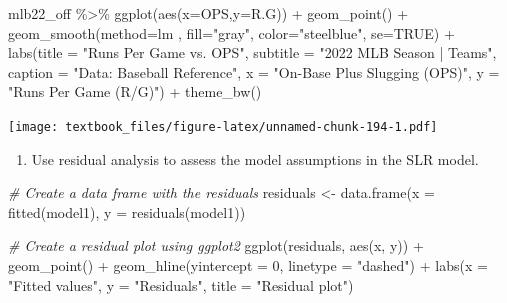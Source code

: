 \documentclass[
  11pt,
]{book}
\newenvironment{Shaded}{\begin{snugshade}}{\end{snugshade}}
\newcommand{\AttributeTok}[1]{\textcolor[rgb]{0.77,0.63,0.00}{#1}}
\newcommand{\CommentTok}[1]{\textcolor[rgb]{0.56,0.35,0.01}{\textit{#1}}}
\newcommand{\ConstantTok}[1]{\textcolor[rgb]{0.00,0.00,0.00}{#1}}
\newcommand{\DecValTok}[1]{\textcolor[rgb]{0.00,0.00,0.81}{#1}}
\newcommand{\FunctionTok}[1]{\textcolor[rgb]{0.00,0.00,0.00}{#1}}
\newcommand{\NormalTok}[1]{#1}
\newcommand{\OtherTok}[1]{\textcolor[rgb]{0.56,0.35,0.01}{#1}}
\newcommand{\SpecialCharTok}[1]{\textcolor[rgb]{0.00,0.00,0.00}{#1}}
\newcommand{\StringTok}[1]{\textcolor[rgb]{0.31,0.60,0.02}{#1}}
\providecommand{\tightlist}{%
  \setlength{\itemsep}{0pt}\setlength{\parskip}{0pt}}
\theoremstyle{definition}
\theoremstyle{definition}
\theoremstyle{definition}
\theoremstyle{definition}
\theoremstyle{remark}
\begin{document}
\begin{Shaded}
\begin{Highlighting}[]
\NormalTok{mlb22\_off }\SpecialCharTok{\%\textgreater{}\%} \FunctionTok{ggplot}\NormalTok{(}\FunctionTok{aes}\NormalTok{(}\AttributeTok{x=}\NormalTok{OPS,}\AttributeTok{y=}\NormalTok{R.G)) }\SpecialCharTok{+} \FunctionTok{geom\_point}\NormalTok{() }\SpecialCharTok{+}
  \FunctionTok{geom\_smooth}\NormalTok{(}\AttributeTok{method=}\NormalTok{lm , }\AttributeTok{fill=}\StringTok{"gray"}\NormalTok{, }\AttributeTok{color=}\StringTok{"steelblue"}\NormalTok{, }\AttributeTok{se=}\ConstantTok{TRUE}\NormalTok{) }\SpecialCharTok{+}
  \FunctionTok{labs}\NormalTok{(}\AttributeTok{title =} \StringTok{"Runs Per Game vs. OPS"}\NormalTok{,}
       \AttributeTok{subtitle =} \StringTok{"2022 MLB Season | Teams"}\NormalTok{,}
       \AttributeTok{caption =} \StringTok{"Data: Baseball Reference"}\NormalTok{, }
       \AttributeTok{x =} \StringTok{"On{-}Base Plus Slugging (OPS)"}\NormalTok{,}
       \AttributeTok{y =} \StringTok{"Runs Per Game (R/G)"}\NormalTok{) }\SpecialCharTok{+}
  \FunctionTok{theme\_bw}\NormalTok{()}
\end{Highlighting}
\end{Shaded}

\texttt{[image: textbook\_files/figure-latex/unnamed-chunk-194-1.pdf]}

\newpage

\begin{enumerate}
\def\labelenumi{(\alph{enumi})}
\setcounter{enumi}{4}
\tightlist
\item
  Use residual analysis to assess the model assumptions in the SLR model.
\end{enumerate}

\begin{Shaded}
\begin{Highlighting}[]
\CommentTok{\# Create a data frame with the residuals}
\NormalTok{residuals }\OtherTok{\textless{}{-}} \FunctionTok{data.frame}\NormalTok{(}\AttributeTok{x =} \FunctionTok{fitted}\NormalTok{(model1), }\AttributeTok{y =} \FunctionTok{residuals}\NormalTok{(model1))}

\CommentTok{\# Create a residual plot using ggplot2}
\FunctionTok{ggplot}\NormalTok{(residuals, }\FunctionTok{aes}\NormalTok{(x, y)) }\SpecialCharTok{+}
  \FunctionTok{geom\_point}\NormalTok{() }\SpecialCharTok{+}
  \FunctionTok{geom\_hline}\NormalTok{(}\AttributeTok{yintercept =} \DecValTok{0}\NormalTok{, }\AttributeTok{linetype =} \StringTok{"dashed"}\NormalTok{) }\SpecialCharTok{+}
  \FunctionTok{labs}\NormalTok{(}\AttributeTok{x =} \StringTok{"Fitted values"}\NormalTok{, }\AttributeTok{y =} \StringTok{"Residuals"}\NormalTok{, }\AttributeTok{title =} \StringTok{"Residual plot"}\NormalTok{)}
\end{Highlighting}
\end{Shaded}
\end{document}
